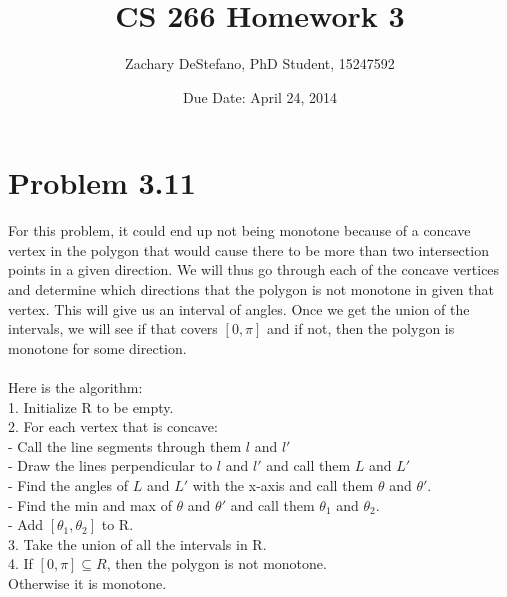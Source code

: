 \documentclass[11pt,psfig]{article}
\begin{document}
\setlength{\parskip}{1.2ex plus0.3ex minus 0.3ex}


\thispagestyle{empty} \pagestyle{myheadings} 



\title{CS 266 Homework 3}
\author{Zachary DeStefano, PhD Student, 15247592}
\date{Due Date: April 24, 2014}

\maketitle

\vfill\eject

\section*{Problem 3.11}

For this problem, it could end up not being monotone because of a concave vertex in the polygon that would cause there to be more than two intersection points in a given direction. We will thus go through each of the concave vertices and determine which directions that the polygon is not monotone in given that vertex. This will give us an interval of angles. Once we get the union of the intervals, we will see if that covers $[0,\pi]$ and if not, then the polygon is monotone for some direction. \\
\\
Here is the algorithm:\\
1. Initialize R to be empty. \\
2. For each vertex that is concave:\\
- Call the line segments through them $l$ and $l'$ \\
- Draw the lines perpendicular to $l$ and $l'$ and call them $L$ and $L'$\\
- Find the angles of $L$ and $L'$ with the x-axis and call them $\theta$ and $\theta'$. \\
- Find the min and max of $\theta$ and $\theta'$ and call them $\theta_1$ and $\theta_2$. \\
- Add $[\theta_1,\theta_2]$ to R.\\
3. Take the union of all the intervals in R. \\
4. If $[0,\pi] \subseteq R$, then the polygon is not monotone. \\
Otherwise it is monotone. 
\end{document}
